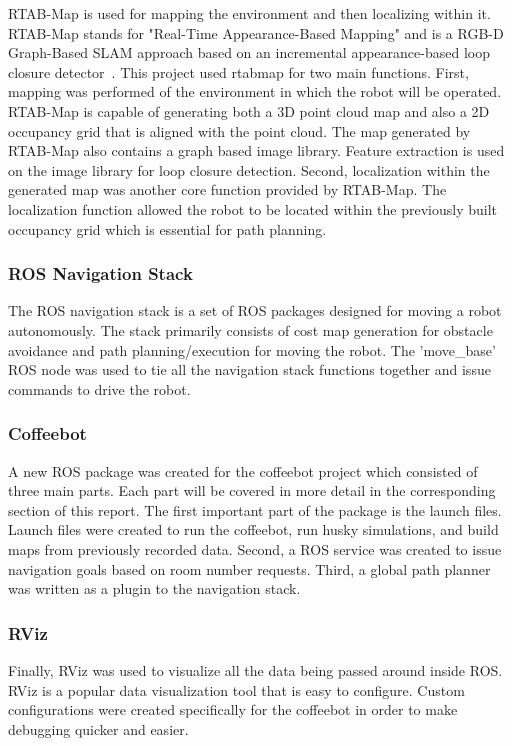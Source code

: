 \documentclass[letterpaper, 10 pt, conference]{ieeeconf}  %
\begin{document}
RTAB-Map is used for mapping the environment and then localizing within it. RTAB-Map stands for "Real-Time Appearance-Based Mapping" and is a RGB-D Graph-Based SLAM approach based on an incremental appearance-based loop closure detector~\cite{rtabmap2014}.
This project used rtabmap for two main functions. First, mapping was performed of the environment in which the robot will be operated. RTAB-Map is capable of generating both a 3D point cloud map and also a 2D occupancy grid that is aligned with the point cloud. The map generated by RTAB-Map also contains a graph based image library. Feature extraction is used on the image library for loop closure detection. Second, localization within the generated map was another core function provided by RTAB-Map. The localization function allowed the robot to be located within the previously built occupancy grid which is essential for path planning.

\subsubsection{ROS Navigation Stack}

The ROS navigation stack is a set of ROS packages designed for moving a robot autonomously. The stack primarily consists of cost map generation for obstacle avoidance and path planning/execution for moving the robot. The 'move\_base' ROS node was used to tie all the navigation stack functions together and issue commands to drive the robot. 

\subsubsection{Coffeebot}

A new ROS package was created for the coffeebot project which consisted of three main parts. Each part will be covered in more detail in the corresponding section of this report. The first important part of the package is the launch files. Launch files were created to run the coffeebot, run husky simulations, and build maps from previously recorded data. Second, a ROS service was created to issue navigation goals based on room number requests. Third, a global path planner was written as a plugin to the navigation stack. 

\subsubsection{RViz}

Finally, RViz was used to visualize all the data being passed around inside ROS. RViz is a popular data visualization tool that is easy to configure. Custom configurations were created specifically for the coffeebot in order to make debugging quicker and easier. 
\end{document}
